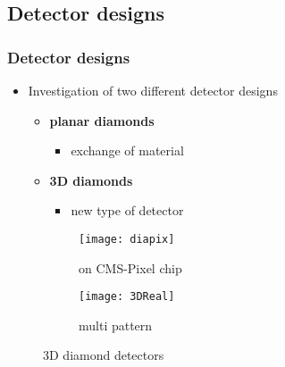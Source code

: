 \subsection{Detector designs}
\begin{frame}
	\frametitle{Detector designs}
	\begin{itemize}
		\item Investigation of two different detector designs
		\vspace*{5pt}
		\begin{itemize}
			\item \textbf{planar diamonds}
			\begin{itemize}
				\item exchange of material
			\end{itemize}
			\item \textbf{3D diamonds}
			\begin{itemize}
				\item new type of detector
			\end{itemize}
		\end{itemize}
	\end{itemize}
	
	\begin{figure}[htbp] 
		\begin{center}
			\begin{subfigure}{0.45\textwidth}  
				\centering 
				\texttt{[image: diapix]}
				\caption{on CMS-Pixel chip}
			\end{subfigure}
			\begin{subfigure}{0.45\textwidth} 
				\centering 
				\texttt{[image: 3DReal]}
				\caption{multi pattern} 	
			\end{subfigure} 
			\caption{3D diamond detectors} 
		\end{center}
	\end{figure}
\end{frame}
